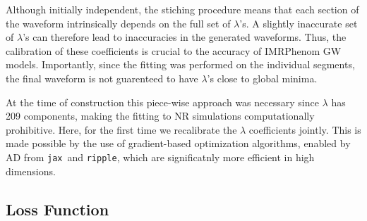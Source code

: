 \documentclass[twocolumn]{aastex631}
\newcommand{\ripple}{\texttt{ripple}}
\newcommand{\jax}{\texttt{jax}}
\newcommand{\kw}[1]{{\color{rb4}[KW: #1 ]}}
\begin{document}
Although initially independent, the stiching procedure means that each section
of the waveform intrinsically depends on the full set of $\lambda$'s. 
A slightly inaccurate set of $\lambda$'s can therefore lead to inaccuracies in
the generated waveforms. 
Thus, the calibration of these coefficients is crucial to the accuracy
of IMRPhenom GW models. 
Importantly, since the fitting was performed on the individual segments,
the final waveform is not guarenteed to have $\lambda$'s close to global minima.


At the time of construction this piece-wise approach was necessary since
$\lambda$ has 209 components, making the fitting to NR simulations computationally prohibitive.
Here, for the first time we recalibrate the $\lambda$ coefficients jointly. 
This is made possible by the use of gradient-based optimization algorithms,
enabled by AD from \jax\, and {\ripple}, which are significatnly more efficient in high dimensions.

\subsection{Loss Function} \label{subsec:loss}
\end{document}
